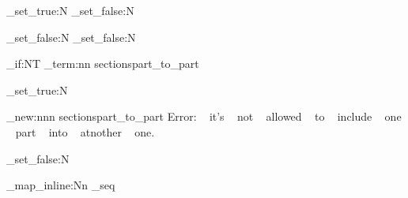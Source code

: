 \NewDocumentCommand{\sections@frame@bgn}{ }
{
    \bool_set_true:N  \sections@bInSection
    \bool_set_false:N \sections@binSubSection

    

    \sections@@onSection@bgn
}

\NewDocumentCommand{\sections@frame@end}{ }
{
    \sections@@onSection@end
    
    \bool_set_false:N \sections@bInSection
    \bool_set_false:N \sections@binSubSection
}

\NewDocumentCommand{\sections@register}{ }
{
    \sections@markSectionAsAdded{\frmNameSection}

    {
    }
}

\NewDocumentCommand{\sections@part@bgn}{}
{
    \bool_if:NT \sections@binSubSection
    {
        \msg_term:nn {sections}{part_to_part}
    }

    \bool_set_true:N \sections@binSubSection

    \sections@@onPart@bgn
}
\msg_new:nnn {sections}{part_to_part}
{
    Error: ~ it's ~ not ~ allowed ~ to ~ include ~ one ~ part ~ into ~ atnother ~ one.
}

\NewDocumentCommand{\sections@part@end}{}
{
    \sections@@onPart@end

    \bool_set_false:N \sections@binSubSection
}


{
    \seq_map_inline:Nn \sections@reg@appendixPaths_seq
    {
        
    }
}
